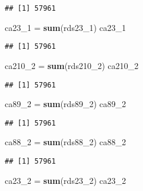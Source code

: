 \documentclass[
]{article}
\newenvironment{Shaded}{\begin{snugshade}}{\end{snugshade}}
\newcommand{\DecValTok}[1]{\textcolor[rgb]{0.00,0.00,0.81}{#1}}
\newcommand{\KeywordTok}[1]{\textcolor[rgb]{0.13,0.29,0.53}{\textbf{#1}}}
\newcommand{\NormalTok}[1]{#1}
\newcommand{\StringTok}[1]{\textcolor[rgb]{0.31,0.60,0.02}{#1}}
\begin{document}
\begin{verbatim}
## [1] 57961
\end{verbatim}

\begin{Shaded}
\begin{Highlighting}[]
\NormalTok{ca23_}\DecValTok{1}\NormalTok{ =}\StringTok{ }\KeywordTok{sum}\NormalTok{(rds23_}\DecValTok{1}\NormalTok{)}
\NormalTok{ca23_}\DecValTok{1}
\end{Highlighting}
\end{Shaded}

\begin{verbatim}
## [1] 57961
\end{verbatim}

\begin{Shaded}
\begin{Highlighting}[]
\NormalTok{ca210_}\DecValTok{2}\NormalTok{ =}\StringTok{ }\KeywordTok{sum}\NormalTok{(rds210_}\DecValTok{2}\NormalTok{)}
\NormalTok{ca210_}\DecValTok{2}
\end{Highlighting}
\end{Shaded}

\begin{verbatim}
## [1] 57961
\end{verbatim}

\begin{Shaded}
\begin{Highlighting}[]
\NormalTok{ca89_}\DecValTok{2}\NormalTok{ =}\StringTok{ }\KeywordTok{sum}\NormalTok{(rds89_}\DecValTok{2}\NormalTok{)}
\NormalTok{ca89_}\DecValTok{2}
\end{Highlighting}
\end{Shaded}

\begin{verbatim}
## [1] 57961
\end{verbatim}

\begin{Shaded}
\begin{Highlighting}[]
\NormalTok{ca88_}\DecValTok{2}\NormalTok{ =}\StringTok{ }\KeywordTok{sum}\NormalTok{(rds88_}\DecValTok{2}\NormalTok{)}
\NormalTok{ca88_}\DecValTok{2}
\end{Highlighting}
\end{Shaded}

\begin{verbatim}
## [1] 57961
\end{verbatim}

\begin{Shaded}
\begin{Highlighting}[]
\NormalTok{ca23_}\DecValTok{2}\NormalTok{ =}\StringTok{ }\KeywordTok{sum}\NormalTok{(rds23_}\DecValTok{2}\NormalTok{)}
\NormalTok{ca23_}\DecValTok{2}
\end{Highlighting}
\end{Shaded}
\end{document}

